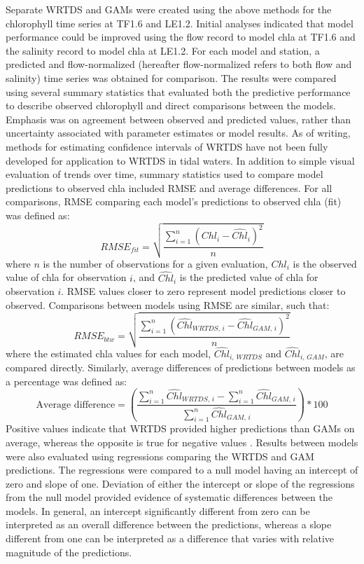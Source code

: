 \documentclass[letterpaper,12pt,oneside]{article}\usepackage[]{graphicx}\usepackage[]{color}
\begin{document}
Separate \ac{WRTDS} and \acp{GAM} were created using the above methods for the chlorophyll time series at TF1.6 and LE1.2.  Initial analyses indicated that model performance could be improved using the flow record to model \ac{chla} at TF1.6 and the salinity record to model \ac{chla} at LE1.2.  For each model and station, a predicted and flow-normalized (hereafter flow-normalized refers to both flow and salinity) time series was obtained for comparison.  The results were compared using several summary statistics that evaluated both the predictive performance to describe observed chlorophyll and direct comparisons between the models.  Emphasis was on agreement between observed and predicted values, rather than uncertainty associated with parameter estimates or model results.  As of writing, methods for estimating confidence intervals of \ac{WRTDS} have not been fully developed for application to \ac{WRTDS} in tidal waters.  In addition to simple visual evaluation of trends over time, summary statistics used to compare model predictions to observed \ac{chla} included \ac{RMSE} and average differences.  For all comparisons, \ac{RMSE} comparing each model's predictions to observed \ac{chla} (fit) was defined as:
\begin{equation}
RMSE_{fit} = \sqrt {\frac{{\sum\limits_{{i = 1}}^n {{{\left( {{Chl_i} - {\hat{Chl}_i}} \right)}^2}} }}{n}}
\end{equation}
where $n$ is the number of observations for a given evaluation, $Chl_i$ is the observed value of \ac{chla} for observation $i$, and ${\hat{Chl}}_i$ is the predicted value of \ac{chla} for observation $i$.  \ac{RMSE} values closer to zero represent model predictions closer to observed.  Comparisons between models using \ac{RMSE} are similar, such that:
\begin{equation}
RMSE_{btw} = \sqrt {\frac{{\sum\limits_{{i = 1}}^n {{{\left( {{\hat{Chl}_{WRTDS,\,i}} - {{\hat{Chl}}_{GAM,\,i}}} \right)}^2}} }}{n}}
\end{equation}
where the estimated \ac{chla} values for each model, $\hat{Chl}_{i,\,WRTDS}$ and $\hat{Chl}_{i,\,GAM}$, are compared directly.  Similarly, average differences of predictions between models as a percentage was defined as:
\begin{equation}
\textrm{Average difference} = \left(\frac{\sum\limits_{i = 1}^n \hat{Chl}_{WRTDS,\,i} - \sum\limits_{i = 1}^n \hat{Chl}_{GAM,\,i}}{\sum\limits_{i = 1}^n \hat{Chl}_{GAM,\,i}}\right) * 100
\end{equation}
Positive values indicate that \ac{WRTDS} provided higher predictions than \acp{GAM} on average, whereas the opposite is true for negative values \citep{Moyer12}.  Results between models were also evaluated using regressions comparing the \ac{WRTDS} and \ac{GAM} predictions.  The regressions were compared to a null model having an intercept of zero and slope of one.  Deviation of either the intercept or slope of the regressions from the null model provided evidence of systematic differences between the models.  In general, an intercept significantly different from zero can be interpreted as an overall difference between the predictions, whereas a slope different from one can be interpreted as a difference that varies with relative magnitude of the predictions.
\end{document}
